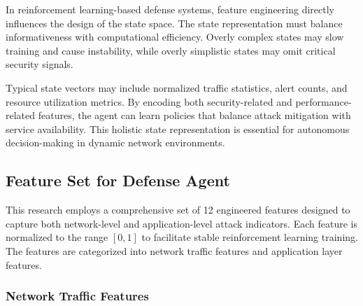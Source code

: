 \documentclass[12pt,a4paper]{report}
\begin{document}
In reinforcement learning-based defense systems, feature engineering directly influences the design of the state space.
The state representation must balance informativeness with computational efficiency.
Overly complex states may slow training and cause instability, while overly simplistic states may omit critical security signals.

Typical state vectors may include normalized traffic statistics, alert counts, and resource utilization metrics.
By encoding both security-related and performance-related features, the agent can learn policies that balance attack mitigation with service availability.
This holistic state representation is essential for autonomous decision-making in dynamic network environments.

\subsection{Feature Set for Defense Agent}

This research employs a comprehensive set of 12 engineered features designed to capture both network-level and application-level attack indicators. Each feature is normalized to the range $[0, 1]$ to facilitate stable reinforcement learning training. The features are categorized into network traffic features and application layer features.

\subsubsection{Network Traffic Features}
\end{document}
